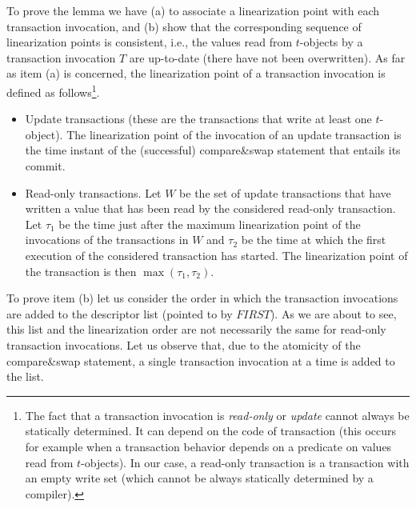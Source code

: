 \begin{proofL}
To prove the lemma we have (a) to associate a linearization point  with 
each  transaction  invocation, and (b) show that the corresponding sequence
of linearization points is consistent, i.e., the values read from  
$t$-objects by a transaction  invocation $T$ are up-to-date  
(there have not been overwritten). 
As far as  item (a) is concerned, the  linearization  point of 
a transaction invocation is defined as follows\footnote{The 
fact  that a  transaction invocation is {\it read-only} or {\it  update} 
cannot always be statically determined. It can depend on the 
code of transaction (this occurs for example when a transaction  
behavior depends on  a predicate on values read from $t$-objects).
In our case, a read-only transaction   is a transaction with an empty write
set (which cannot be always statically determined   by a compiler).}.
\begin{itemize}
\item Update transactions 
(these are the transactions that write at least one $t$-object). 
The linearization point of the invocation of an update transaction is the time 
instant of the (successful) compare\&swap statement that entails its commit.  
\item Read-only transactions. 
Let $W$  be the set of update  transactions that have written  a value that
has been read 
by the considered read-only transaction. Let $\tau_1$ be the time just after
the maximum linearization point of the invocations of the transactions in $W$ 
and $\tau_2$ be the time at which the first execution 
of the considered transaction has started.
The linearization point of the transaction is then $\max(\tau_1,\tau_2)$.
%
\end{itemize}

To prove item (b) let us consider the order in which  the transaction 
invocations are added to the descriptor list (pointed to by $\mathit{FIRST}$). 
As we are about to see, this  list and the linearization order are not
necessarily the same for read-only transaction invocations.  
Let us observe that, due  to the atomicity of the compare\&swap statement, 
a single transaction  invocation at a time is added to the list.


\end{proofL}
